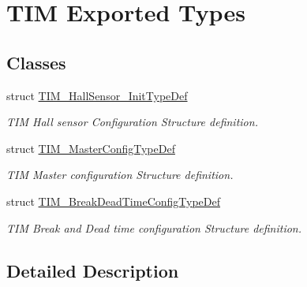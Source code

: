 \hypertarget{group___t_i_m_ex___exported___types}{}\section{T\+IM Exported Types}
\label{group___t_i_m_ex___exported___types}
\subsection*{Classes}
\begin{DoxyCompactItemize}
\item 
struct \hyperlink{struct_t_i_m___hall_sensor___init_type_def}{T\+I\+M\+\_\+\+Hall\+Sensor\+\_\+\+Init\+Type\+Def}
\begin{DoxyCompactList}\small\item\em T\+IM Hall sensor Configuration Structure definition. \end{DoxyCompactList}\item 
struct \hyperlink{struct_t_i_m___master_config_type_def}{T\+I\+M\+\_\+\+Master\+Config\+Type\+Def}
\begin{DoxyCompactList}\small\item\em T\+IM Master configuration Structure definition. \end{DoxyCompactList}\item 
struct \hyperlink{struct_t_i_m___break_dead_time_config_type_def}{T\+I\+M\+\_\+\+Break\+Dead\+Time\+Config\+Type\+Def}
\begin{DoxyCompactList}\small\item\em T\+IM Break and Dead time configuration Structure definition. \end{DoxyCompactList}\end{DoxyCompactItemize}


\subsection{Detailed Description}
